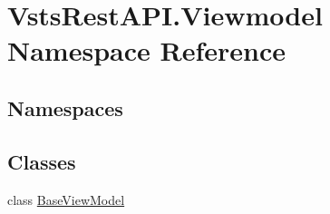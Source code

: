 \hypertarget{namespace_vsts_rest_a_p_i_1_1_viewmodel}{}\section{Vsts\+Rest\+A\+P\+I.\+Viewmodel Namespace Reference}
\label{namespace_vsts_rest_a_p_i_1_1_viewmodel}
\subsection*{Namespaces}
\begin{DoxyCompactItemize}
\end{DoxyCompactItemize}
\subsection*{Classes}
\begin{DoxyCompactItemize}
\item 
class \mbox{\hyperlink{class_vsts_rest_a_p_i_1_1_viewmodel_1_1_base_view_model}{Base\+View\+Model}}
\end{DoxyCompactItemize}
